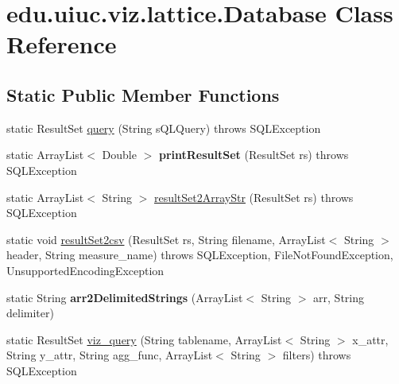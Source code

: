 \hypertarget{classedu_1_1uiuc_1_1viz_1_1lattice_1_1_database}{}\section{edu.\+uiuc.\+viz.\+lattice.\+Database Class Reference}
\label{classedu_1_1uiuc_1_1viz_1_1lattice_1_1_database}
\subsection*{Static Public Member Functions}
\begin{DoxyCompactItemize}
\item 
static Result\+Set \mbox{\hyperlink{classedu_1_1uiuc_1_1viz_1_1lattice_1_1_database_ab547c694ede275d726dac8672dd27edb}{query}} (String s\+Q\+L\+Query)  throws S\+Q\+L\+Exception 
\item 
\mbox{\label{classedu_1_1uiuc_1_1viz_1_1lattice_1_1_database_af9a49bec7eab55279c595bb3989a439b}} 
static Array\+List$<$ Double $>$ {\bfseries print\+Result\+Set} (Result\+Set rs)  throws S\+Q\+L\+Exception 
\item 
static Array\+List$<$ String $>$ \mbox{\hyperlink{classedu_1_1uiuc_1_1viz_1_1lattice_1_1_database_a89bd76cd775c2bdf5a8a8701b32eff8c}{result\+Set2\+Array\+Str}} (Result\+Set rs)  throws S\+Q\+L\+Exception 
\item 
static void \mbox{\hyperlink{classedu_1_1uiuc_1_1viz_1_1lattice_1_1_database_a5202135211d571ce60077240ad0a2997}{result\+Set2csv}} (Result\+Set rs, String filename, Array\+List$<$ String $>$ header, String measure\+\_\+name)  throws S\+Q\+L\+Exception, File\+Not\+Found\+Exception, Unsupported\+Encoding\+Exception 
\item 
\mbox{\label{classedu_1_1uiuc_1_1viz_1_1lattice_1_1_database_ae3af32718158ce25501134ff753ade51}} 
static String {\bfseries arr2\+Delimited\+Strings} (Array\+List$<$ String $>$ arr, String delimiter)
\item 
static Result\+Set \mbox{\hyperlink{classedu_1_1uiuc_1_1viz_1_1lattice_1_1_database_a1c068934b872f09fa921a39c1094e39d}{viz\+\_\+query}} (String tablename, Array\+List$<$ String $>$ x\+\_\+attr, String y\+\_\+attr, String agg\+\_\+func, Array\+List$<$ String $>$ filters)  throws S\+Q\+L\+Exception 
\item 

\end{DoxyCompactItemize}
